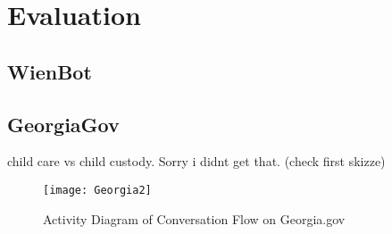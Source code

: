 \chapter{Evaluation}
\label{evaluation}



\section{WienBot}

\section{GeorgiaGov}


child care
vs child custody. Sorry i didnt get that. (check first skizze)

\begin{figure}[p]

	\caption[Conversation Flow on Georgia.gov]{Activity Diagram of Conversation Flow on Georgia.gov}
	\centering
	\texttt{[image: Georgia2]}
	\label{astah:georgiaActivity}
\end{figure}

